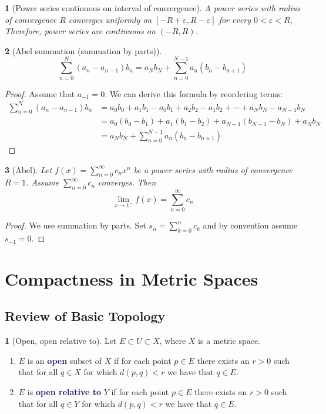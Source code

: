 \documentclass[11pt]{article}
\numberwithin{equation}{section}
\newcommand{\navy}[1]{\textcolor{MidnightBlue}{\bf #1}}
\theoremstyle{plain}
\newtheorem{theorem}{\color{ForestGreen}{\textbf{Theorem}}}[section]
\theoremstyle{definition}
\newtheorem{definition}{\color{MidnightBlue}{\textbf{Definition}}}[section]
\newcommand{\1}{\mathbbm 1}
\newcommand{\e}{\varepsilon}
\begin{document}
\begin{theorem}[Power series continuous on interval of convergence]
	A power series with radius of convergence $R$ converges uniformly on $[-R + \e, R- \e]$ for every $0 < \e < R$, Therefore, power series are continuous on $(-R,R)$.
\end{theorem}

\begin{theorem}[Abel summation (summation by parts)]
	\begin{equation}
		\sum_{n=0}^N (a_n - a_{n-1})b_n = a_Nb_N + \sum_{n=0}^{N-1}a_n(b_n - b_{n+1})
	\end{equation}
\end{theorem}
\begin{proof}
	Assume that $a_{-1} = 0$. We can derive this formula by reordering terms:
	\begin{align*}
		\sum_{n=0}^N (a_n - a_{n-1})b_n &= a_0b_0 + a_1b_1 - a_0b_1 + a_2b_2 - a_1b_2 + \cdots + a_{N}b_N - a_{N-1}b_N \\
		&= a_0(b_0 - b_1) + a_1(b_1 - b_2) + a_{N-1}(b_{N-1} - b_N) + a_N b_N \\
		&= a_Nb_N + \sum_{n=0}^{N-1}a_n(b_n - b_{n+1})
	\end{align*}
	
\end{proof}

\begin{theorem}[Abel]
	Let $f(x) = \sum_{n=0}^\infty c_n x^n$ be a power series with radius of convergence $R=1$. Assume $\sum_{n=0}^\infty c_n$ converges. Then 
	\begin{equation}
		\lim_{x \to 1^-} f(x) = \sum_{n=0}^\infty c_n
	\end{equation}
\end{theorem}
\begin{proof}
	We use summation by parts. Set $s_n = \sum_{k=0}^n c_k$ and by convention assume $s_{-1} = 0$. 
\end{proof}

\section{Compactness in Metric Spaces}

\subsection{Review of Basic Topology}

\begin{definition}[Open, open relative to]
	Let $E \subset U \subset X$, where $X$ is a metric space. 
	\begin{enumerate}
		\item $E$ is an \navy{open} subset of $X$ if for each point $p \in E$ there exists an $r > 0$ such that for all $q \in X$ for which $d(p,q) < r$ we have that $q \in E$. 
		\item $E$ is \navy{open relative to} $Y$ if for each point $p \in E$ there exists an $r > 0$ such that for all $q \in Y$ for which $d(p,q) < r$ we have that $q \in E$.
	\end{enumerate}
\end{definition}
\end{document}
